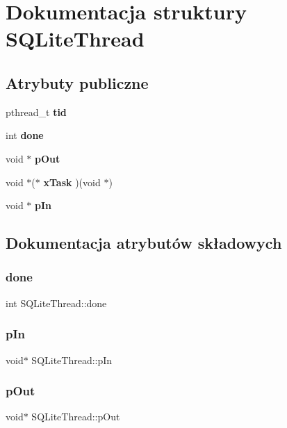 \section{Dokumentacja struktury S\+Q\+Lite\+Thread}
\label{struct_s_q_lite_thread}
\subsection*{Atrybuty publiczne}
\begin{DoxyCompactItemize}
\item 
pthread\+\_\+t \textbf{ tid}
\item 
int \textbf{ done}
\item 
void $\ast$ \textbf{ p\+Out}
\item 
void $\ast$($\ast$ \textbf{ x\+Task} )(void $\ast$)
\item 
void $\ast$ \textbf{ p\+In}
\end{DoxyCompactItemize}


\subsection{Dokumentacja atrybutów składowych}
\mbox{\label{struct_s_q_lite_thread_af13ecbf8ad23f24a5074277cdcf0383b}} 
\subsubsection{done}
{\footnotesize\ttfamily int S\+Q\+Lite\+Thread\+::done}

\mbox{\label{struct_s_q_lite_thread_ad14ce51f32c66b80c515ec2338f6ccd2}} 
\subsubsection{pIn}
{\footnotesize\ttfamily void$\ast$ S\+Q\+Lite\+Thread\+::p\+In}

\mbox{\label{struct_s_q_lite_thread_aca6d94405a6e7eefb230cd08bf1ce71b}} 
\subsubsection{pOut}
{\footnotesize\ttfamily void$\ast$ S\+Q\+Lite\+Thread\+::p\+Out}

\mbox{\label{struct_s_q_lite_thread_a344b7b30ad7f54c6cbfb4d2378982610}} 
